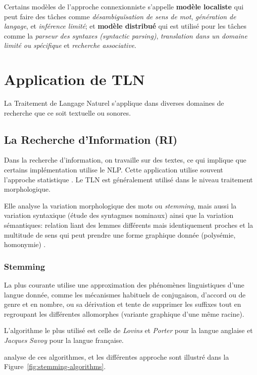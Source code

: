 Certains modèles de l'approche connexionniste s'appelle \textbf{modèle localiste} qui peut faire des tâches comme \emph{désambiguïsation de sens de mot}, \emph{génération de langage}, et \emph{inférence limité}; et \textbf{modèle distribué} qui est utilisé pour les tâches comme la \emph{parseur des syntaxes (syntactic parsing)}, \emph{translation dans un domaine limité ou spécifique} et \emph{recherche associative}.

\section{Application de TLN}
La Traitement de Langage Naturel s'applique dans diverses domaines de recherche que ce soit textuelle ou sonores.

\subsection*{La Recherche d'Information (RI)}
Dans la recherche d'information, on travaille sur des textes, ce qui implique que certains implémentation utilise le NLP. Cette application utilise souvent l'approche statistique \citep{natural-language-processing}. Le TLN est généralement utilisé dans le niveau traitement morphologique.

Elle analyse la variation morphologique des mots ou \emph{stemming}, mais aussi la variation syntaxique (étude des syntagmes nominaux) ainsi que la variation sémantiques: relation liant des lemmes différents mais identiquement proches et la multitude de sens qui peut prendre une forme graphique donnée (polysémie, homonymie) \citep{automatic-nlp}.

\subsubsection*{Stemming}
\citep{automatic-nlp} La plus courante utilise une approximation des phénomènes linguistiques d'une langue donnée, comme les mécanismes habituels de conjugaison, d'accord ou de genre et en nombre, ou sa dérivation et tente de supprimer les suffixes tout en regroupant les différentes allomorphes (variante graphique d'une même racine).

L'algorithme le plus utilisé est celle de \emph{Lovins} et \emph{Porter} pour la langue anglaise et \emph{Jacques Savoy} pour la langue française.

\citep{stemming-algorithms} analyse de ces algorithmes, et les différentes approche sont illustré dans la Figure~\ref{fig:stemming-algorithms}.

